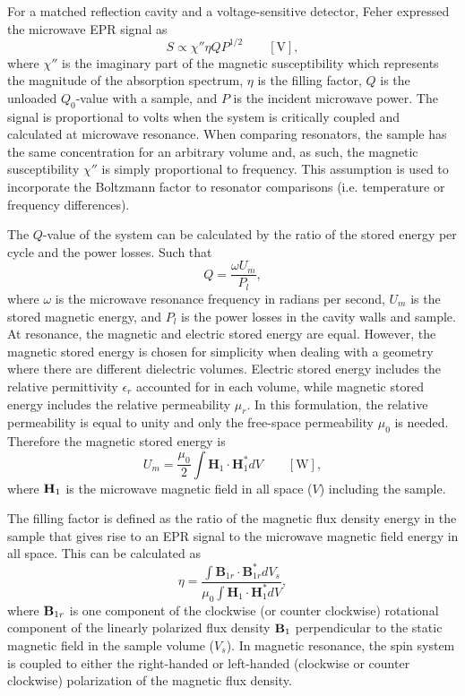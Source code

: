 For a matched reflection cavity and a voltage-sensitive detector, Feher expressed the microwave EPR signal as
\begin{equation}
    S \propto \chi'' \eta Q P^{1/2} \qquad [\text{V}],\label{ch2-fehereq}
\end{equation}
where $\chi''$ is the imaginary part of the magnetic susceptibility which represents the magnitude of the absorption spectrum, $\eta$ is the filling factor, $Q$ is the unloaded $Q_0$-value with a sample, and $P$ is the incident microwave power.  \cite{FeherSignal} The signal is proportional to volts when the system is critically coupled and calculated at microwave resonance. When comparing resonators, the sample has the same concentration for an arbitrary volume and, as such, the magnetic susceptibility $\chi''$ is simply proportional to frequency. This assumption is used to incorporate the Boltzmann factor to resonator comparisons (i.e. temperature or frequency differences).

The $Q$-value of the system can be calculated by the ratio of the stored energy per cycle and the power losses. Such that
\begin{equation}
    Q = \frac{\omega U_m}{P_l},\label{ch2-Qval}
\end{equation}
where $\omega$ is the microwave resonance frequency in radians per second, $U_m$ is the stored magnetic energy, and $P_l$ is the power losses in the cavity walls and sample. At resonance, the magnetic and electric stored energy are equal. \cite{ramo1984fields} However, the magnetic stored energy is chosen for simplicity when dealing with a geometry where there are different dielectric volumes. Electric stored energy includes the relative permittivity $\epsilon_r$ accounted for in each volume, while magnetic stored energy includes the relative permeability $\mu_r$. In this formulation, the relative permeability is equal to unity and only the free-space permeability $\mu_0$ is needed. Therefore the magnetic stored energy is
\begin{equation}
    U_m = \frac{\mu_0}{2} \int \mathbf{H}_1\cdot\mathbf{H}_1^* dV \qquad [\text{W}],
\end{equation}
where ${\textbf H}_1$ is the microwave magnetic field in all space ($V$) including the sample.

The filling factor is defined as the ratio of the magnetic flux density energy in the sample that gives rise to an EPR signal to the microwave magnetic field energy in all space. This can be calculated as
\begin{equation}
 \eta = \frac{\int {\mathbf B}_{1r} \cdot {\mathbf B}_{1r}^* dV_s}{\mu_0 \int {\mathbf H}_1 \cdot {\mathbf H}_1^* dV}, \label{eq-2:filling}
\end{equation}
where ${\textbf B}_{1r}$ is one component of the clockwise (or counter clockwise) rotational component of the linearly polarized flux density ${\textbf B}_1$ perpendicular to the static magnetic field in the sample volume ($V_s$). \cite{jackson1975classical} In magnetic resonance, the spin system is coupled to either the right-handed or left-handed (clockwise or counter clockwise) polarization of the magnetic flux density. \cite{abragam1961}

